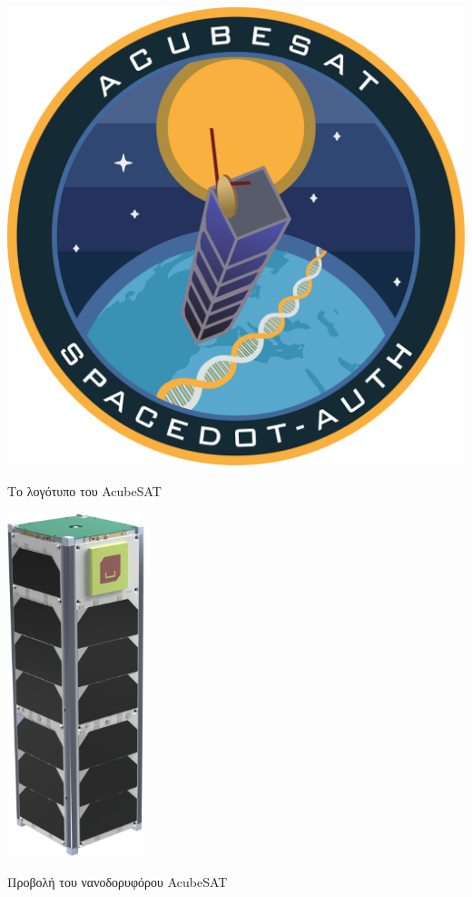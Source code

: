 \documentclass[a4paper,nobib,justified]{tufte-book}
\begin{document}
\begin{marginfigure}
	\centering
	\includegraphics{media/acubesat_patch.pdf}
	\caption{Το λογότυπο του AcubeSAT}

	\includegraphics[height=10cm]{media/images/acubesat.png}
	\caption{Προβολή του νανοδορυφόρου AcubeSAT}
\end{marginfigure}
\end{document}
